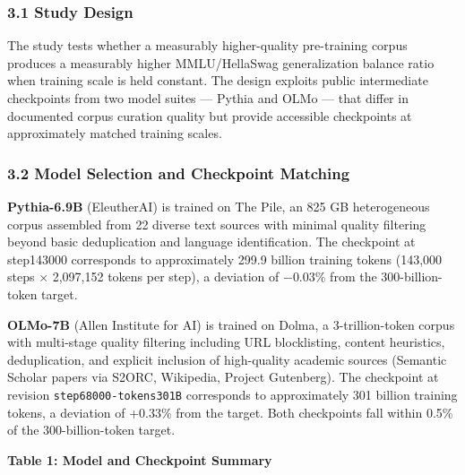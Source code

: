 
\subsubsection{3.1 Study Design}

The study tests whether a measurably higher-quality pre-training corpus produces a measurably higher MMLU/HellaSwag generalization balance ratio when training scale is held constant. The design exploits public intermediate checkpoints from two model suites --- Pythia \citep{Biderman2023Pythia} and OLMo \citep{Groeneveld2024OLMo} --- that differ in documented corpus curation quality but provide accessible checkpoints at approximately matched training scales.

\subsubsection{3.2 Model Selection and Checkpoint Matching}

\textbf{Pythia-6.9B} (EleutherAI) is trained on The Pile, an 825 GB heterogeneous corpus assembled from 22 diverse text sources with minimal quality filtering beyond basic deduplication and language identification. The checkpoint at step143000 corresponds to approximately 299.9 billion training tokens (143,000 steps $\times$ 2,097,152 tokens per step), a deviation of $-0.03$\% from the 300-billion-token target.

\textbf{OLMo-7B} (Allen Institute for AI) is trained on Dolma, a 3-trillion-token corpus with multi-stage quality filtering including URL blocklisting, content heuristics, deduplication, and explicit inclusion of high-quality academic sources (Semantic Scholar papers via S2ORC, Wikipedia, Project Gutenberg). The checkpoint at revision \texttt{step68000-tokens301B} corresponds to approximately 301 billion training tokens, a deviation of +0.33\% from the target. Both checkpoints fall within 0.5\% of the 300-billion-token target.

\textbf{Table 1: Model and Checkpoint Summary}

\begin{table}[htbp]
\centering
{}
\end{table}


